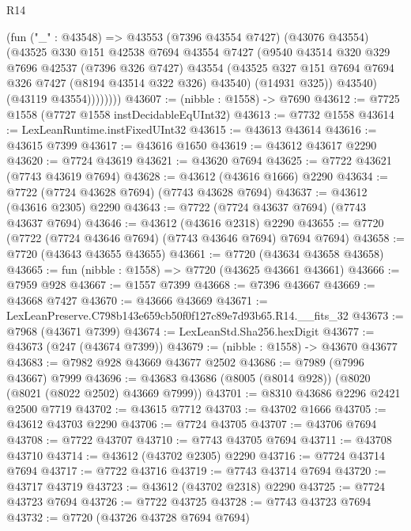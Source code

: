 \begin{lexlean}{R14}
\begin{coremodule}
                (fun ("_" : @43548) =>
                @43553
                  (@7396 @43554 @7427)
                  (@43076 @43554)
                  (@43525
                    @330
                    @151
                    @42538
                    @7694
                    @43554
                    @7427
                    (@9540
                      @43514
                      @320
                      @329
                      @7696
                      @42537
                      (@7396 @326 @7427)
                      @43554
                      (@43525 @327 @151 @7694 @7694 @326 @7427 (@8194 @43514 @322 @326) @43540)
                      (@14931 @325))
                    @43540)
                  (@43119 @43554))))))))
@43607 := (nibble : @1558) -> @7690
@43612 := @7725 @1558 (@7727 @1558 instDecidableEqUInt32)
@43613 := @7732 @1558
@43614 := LexLeanRuntime.instFixedUInt32
@43615 := @43613 @43614
@43616 := @43615 @7399
@43617 := @43616 @1650
@43619 := @43612 @43617 @2290
@43620 := @7724 @43619
@43621 := @43620 @7694
@43625 := @7722 @43621 (@7743 @43619 @7694)
@43628 := @43612 (@43616 @1666) @2290
@43634 := @7722 (@7724 @43628 @7694) (@7743 @43628 @7694)
@43637 := @43612 (@43616 @2305) @2290
@43643 := @7722 (@7724 @43637 @7694) (@7743 @43637 @7694)
@43646 := @43612 (@43616 @2318) @2290
@43655 := @7720 (@7722 (@7724 @43646 @7694) (@7743 @43646 @7694) @7694 @7694)
@43658 := @7720 (@43643 @43655 @43655)
@43661 := @7720 (@43634 @43658 @43658)
@43665 := fun (nibble : @1558) => @7720 (@43625 @43661 @43661)
@43666 := @7959 @928
@43667 := @1557 @7399
@43668 := @7396 @43667
@43669 := @43668 @7427
@43670 := @43666 @43669
@43671 := LexLeanPreserve.C798b143e659cb50f0f127c89e7d93b65.R14.__fits_32
@43673 := @7968 (@43671 @7399)
@43674 := LexLeanStd.Sha256.hexDigit
@43677 := @43673 (@247 (@43674 @7399))
@43679 := (nibble : @1558) -> @43670 @43677
@43683 := @7982 @928 @43669 @43677 @2502
@43686 := @7989 (@7996 @43667) @7999
@43696 := @43683 @43686 (@8005 (@8014 @928)) (@8020 (@8021 (@8022 @2502) @43669 @7999))
@43701 := @8310 @43686 @2296 @2421 @2500 @7719
@43702 := @43615 @7712
@43703 := @43702 @1666
@43705 := @43612 @43703 @2290
@43706 := @7724 @43705
@43707 := @43706 @7694
@43708 := @7722 @43707
@43710 := @7743 @43705 @7694
@43711 := @43708 @43710
@43714 := @43612 (@43702 @2305) @2290
@43716 := @7724 @43714 @7694
@43717 := @7722 @43716
@43719 := @7743 @43714 @7694
@43720 := @43717 @43719
@43723 := @43612 (@43702 @2318) @2290
@43725 := @7724 @43723 @7694
@43726 := @7722 @43725
@43728 := @7743 @43723 @7694
@43732 := @7720 (@43726 @43728 @7694 @7694)

\end{coremodule}
\end{lexlean}

